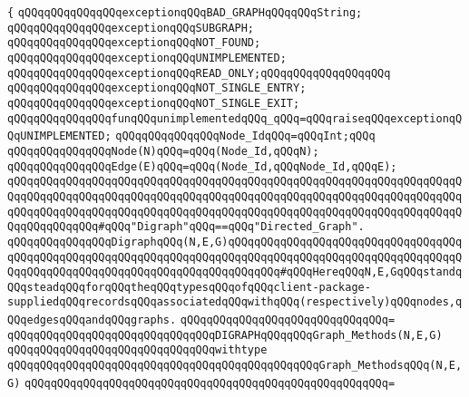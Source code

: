 \verb|{|\newline
\verb|qQQqqQQqqQQqqQQqexceptionqQQqBAD_GRAPHqQQqqQQqString;|\newline
\verb|qQQqqQQqqQQqqQQqexceptionqQQqSUBGRAPH;|\newline
\verb|qQQqqQQqqQQqqQQqexceptionqQQqNOT_FOUND;|\newline
\verb|qQQqqQQqqQQqqQQqexceptionqQQqUNIMPLEMENTED;|\newline
\verb|qQQqqQQqqQQqqQQqexceptionqQQqREAD_ONLY;qQQqqQQqqQQqqQQqqQQq|\newline
\verb|qQQqqQQqqQQqqQQqexceptionqQQqNOT_SINGLE_ENTRY;|\newline
\verb|qQQqqQQqqQQqqQQqexceptionqQQqNOT_SINGLE_EXIT;|\newline
\newline
\verb|qQQqqQQqqQQqqQQqfunqQQqunimplementedqQQq_qQQq=qQQqraiseqQQqexceptionqQQqUNIMPLEMENTED;|\newline
\newline
\verb|qQQqqQQqqQQqqQQqNode_IdqQQq=qQQqInt;qQQq|\newline
\newline
\verb|qQQqqQQqqQQqqQQqNode(N)qQQq=qQQq(Node_Id,qQQqN);|\newline
\verb|qQQqqQQqqQQqqQQqEdge(E)qQQq=qQQq(Node_Id,qQQqNode_Id,qQQqE);|\newline
\verb|qQQqqQQqqQQqqQQqqQQqqQQqqQQqqQQqqQQqqQQqqQQqqQQqqQQqqQQqqQQqqQQqqQQqqQQqqQQqqQQqqQQqqQQqqQQqqQQqqQQqqQQqqQQqqQQqqQQqqQQqqQQqqQQqqQQqqQQqqQQqqQQqqQQqqQQqqQQqqQQqqQQqqQQqqQQqqQQqqQQqqQQqqQQqqQQqqQQqqQQqqQQqqQQqqQQqqQQqqQQqqQQq#qQQq"Digraph"qQQq==qQQq"Directed_Graph".|\newline
\verb|qQQqqQQqqQQqqQQqDigraphqQQq(N,E,G)qQQqqQQqqQQqqQQqqQQqqQQqqQQqqQQqqQQqqQQqqQQqqQQqqQQqqQQqqQQqqQQqqQQqqQQqqQQqqQQqqQQqqQQqqQQqqQQqqQQqqQQqqQQqqQQqqQQqqQQqqQQqqQQqqQQqqQQqqQQqqQQqqQQq#qQQqHereqQQqN,E,GqQQqstandqQQqsteadqQQqforqQQqtheqQQqtypesqQQqofqQQqclient-package-suppliedqQQqrecordsqQQqassociatedqQQqwithqQQq(respectively)qQQqnodes,qQQqedgesqQQqandqQQqgraphs.|\newline
\verb|qQQqqQQqqQQqqQQqqQQqqQQqqQQqqQQq=|\newline
\verb|qQQqqQQqqQQqqQQqqQQqqQQqqQQqqQQqDIGRAPHqQQqqQQqGraph_Methods(N,E,G)|\newline
\verb|qQQqqQQqqQQqqQQqqQQqqQQqqQQqqQQqwithtype|\newline
\verb|qQQqqQQqqQQqqQQqqQQqqQQqqQQqqQQqqQQqqQQqqQQqqQQqGraph_MethodsqQQq(N,E,G)|\newline
\verb|qQQqqQQqqQQqqQQqqQQqqQQqqQQqqQQqqQQqqQQqqQQqqQQqqQQqqQQq=|\newline
